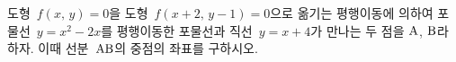 도형~$f(x,\,y)=0$을 도형~$f(x+2,\,y-1)=0$으로 옮기는 평행이동에 의하여 포물선~$y=x^2-2x$를 평행이동한 포물선과 직선~$y=x+4$가 만나는 두 점을 $\mathrm{A}$, $\mathrm{B}$라 하자. 이때 선분~$\mathrm{AB}$의 중점의 좌표를 구하시오.
